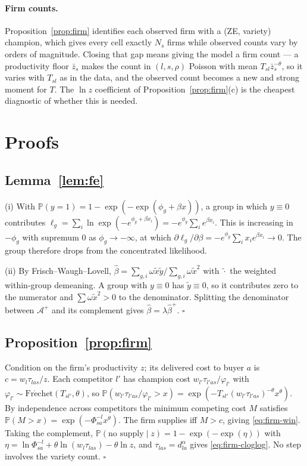 \documentclass[11pt]{article}
\newcommand{\Prob}{\mathbb{P}}
\newcommand{\Frechet}{\mathrm{Fr\acute{e}chet}}
\newcommand{\Areas}{\mathcal{A}}
\begin{document}
\paragraph{Firm counts.} Proposition~\ref{prop:firm} identifies each observed firm with a
(ZE, variety) champion, which gives every cell exactly $N_{s}$ firms while observed counts vary by
orders of magnitude. Closing that gap means giving the model a firm count --- a productivity floor
$\bar z_{s}$ makes the count in $(l,s,\rho)$ Poisson with mean $T_{sl}\bar z_{s}^{-\theta}$, so it
varies with $T_{sl}$ as in the data, and the observed count becomes a new and strong moment for
$T$. The $\ln z$ coefficient of Proposition~\ref{prop:firm}(c) is the cheapest diagnostic of
whether this is needed.

\appendix

\section{Proofs}
\label{app:proofs}

\subsection*{Lemma~\ref{lem:fe}}

(i) With $\Prob(y=1)=1-\exp(-\exp(\phi_{g}+\beta x))$, a group in which $y\equiv0$ contributes
$\ell_{g}=\sum_{i}\ln\exp(-e^{\phi_{g}+\beta x_{i}})=-e^{\phi_{g}}\sum_{i}e^{\beta x_{i}}$. This is
increasing in $-\phi_{g}$ with supremum $0$ as $\phi_{g}\to-\infty$, at which
$\partial\ell_{g}/\partial\beta=-e^{\phi_{g}}\sum_{i}x_{i}e^{\beta x_{i}}\to0$. The group therefore
drops from the concentrated likelihood.

(ii) By Frisch--Waugh--Lovell,
$\hat\beta=\sum_{g,i}\omega\tilde x\tilde y/\sum_{g,i}\omega\tilde x^{2}$ with $\tilde\cdot$ the
weighted within-group demeaning. A group with $y\equiv0$ has $\tilde y\equiv0$, so it contributes
zero to the numerator and $\sum\omega\tilde x^{2}>0$ to the denominator. Splitting the denominator
between $\Areas^{+}$ and its complement gives $\hat\beta=\lambda\hat\beta^{+}$. \hfill$\square$

\subsection*{Proposition~\ref{prop:firm}}

Condition on the firm's productivity $z$; its delivered cost to buyer $a$ is $c=w_{l}\tau_{las}/z$.
Each competitor $l'$ has champion cost $w_{l'}\tau_{l'as}/\varphi_{l'}$ with
$\varphi_{l'}\sim\Frechet(T_{sl'},\theta)$, so
$\Prob(w_{l'}\tau_{l'as}/\varphi_{l'}>x)=\exp(-T_{sl'}(w_{l'}\tau_{l'as})^{-\theta}x^{\theta})$.
By independence across competitors the minimum competing cost $M$ satisfies
$\Prob(M>x)=\exp(-\Phi^{-l}_{sa}x^{\theta})$. The firm supplies iff $M>c$, giving
\eqref{eq:firm-win}. Taking the complement,
$\Prob(\text{no supply}\mid z)=1-\exp(-\exp(\eta))$ with
$\eta=\ln\Phi^{-l}_{sa}+\theta\ln(w_{l}\tau_{las})-\theta\ln z$, and $\tau_{las}=d_{la}^{\alpha}$
gives \eqref{eq:firm-cloglog}. No step involves the variety count. \hfill$\square$
\end{document}

